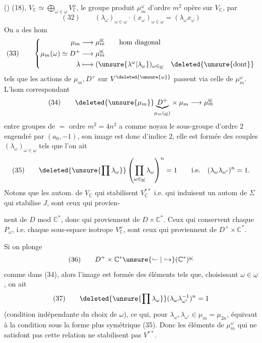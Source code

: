 () (18), $V_{\mathbb C}\simeq\bigoplus_{\omega\in\underline\omega}V_{\mathbb C}^{\omega}$, le groupe produit $\mu_m^{\underline\omega}$ d'ordre $m^2$ opère sur $V_{\mathbb C}$, par
\[
(32)\qquad(\lambda_\omega)_{\omega\in\underline\omega}\cdot(x_\omega)_{\omega\in\underline\omega}=(\lambda_\omega x_\omega)
\]
On  a des hom
\[
(33)\qquad\left\{\begin{aligned}
\mu_m&\longrightarrow\mu_m^{\underline\omega}\qquad\text{hom diagonal}\\
\mu_m(\omega)\simeq D^+&\longrightarrow\mu_m^{\underline\omega}\\
\lambda&\longmapsto(\unsure{\lambda^\omega|\lambda_\omega})_{\omega\in\underline\omega}\quad\deleted{\unsure{\mathrm{dont}}}
\end{aligned}\right.
\]
tels que les actions de $\mu_m,D^+$ sur $V^{\deleted{\unsure{\omega}}}$  passent via celle de $\mu_m^{\underline\omega}$. L'hom correspondant
\[
(34)\qquad\deleted{\unsure{\mu_m}}\underset{\mu_m(\underline\omega)}{\underbrace{D^+}}\times\mu_m\longrightarrow\mu_m^{\underline\omega}
\]
entre groupes de $=$ ordre $m^2=4n^2$ a comme noyau le sous-groupe d'ordre $2$ engendré par  $(a_0,-1)$, son image est donc d'indice $2$, elle est formée des couples $(\lambda_\omega)_{\omega\in\underline\omega}$ tels que l'on ait
\[
(35)\qquad\deleted{\unsure{\prod\lambda_\omega}}\left(\prod_{\omega\in\underline\omega}\lambda_\omega\right)^n=1\qquad\mathrm{i.e.}\quad(\lambda_\omega\lambda_{\omega'})^n=1.
\]
Notons que les autom. de $V_{\mathbb C}$ qui stabilisent $V_{\mathbb C}^{**}$ i.e. qui induisent un autom de $\Sigma$ qui stabilise $J$, sont ceux qui provien-

nent de $D$ mod $\mathbb C^*$, donc qui proviennent de $D\times\mathbb C^*$. Ceux qui conservent  chaque $P_\omega$, i.e. chaque sous-espace isotrope $V_{\mathbb C}^\omega$, sont ceux qui proviennent de $D^+\times\mathbb C^*$.

Si on plonge
\[
(36)\qquad D^+\times\mathbb C^*\unsure{\lhook\joinrel\relbar|\hookrightarrow}(\mathbb C^*)^{\underline\omega}
\]
comme dans (34), alors l'image est formée des éléments \inserted{$(\lambda_\omega)_{\omega\in\underline\omega}$} tels que, choisissant $\omega\in\underline\omega$, on ait
\[
(37)\qquad\deleted{\unsure{\prod\lambda_\omega}}(\lambda_\omega\lambda_{\omega'}^{-1})^n=1
\]
(condition indépendante du choix de $\omega$), ce qui, pour  $\lambda_\omega,\lambda_{\omega'}\in\mu_m=\mu_{2n}$, équivaut à la condition sous la forme plus symétrique  (35). Donc les éléments de $\mu_m^{\underline\omega}$ qui ne satisfont pas cette relation ne stabilisent pas $V^{**}$.


